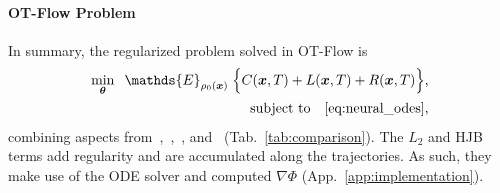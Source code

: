 \documentclass[letterpaper]{article}
\newcommand{\bfth}{\boldsymbol{\theta}}
\newcommand{\bfx}{\boldsymbol{x}}
\newcommand{\model}{OT-Flow} %
\newcommand{\E}{\ensuremath{\mathds{E}}}
\begin{document}
    


    \paragraph{\model{} Problem} In summary, the regularized problem solved in \model{} is 
	\begin{equation}
		\label{eq:MFGFlowObj}
		\begin{split}
		\min_{\bfth} \;\; \E_{\rho_0(\bfx)} \; \Big\{C(\bfx, T) + L(\bfx,T) + R(\bfx,T) \Big\}, \\ \text{subject to} \quad \eqref{eq:neural_odes}, 
		\end{split}
	\end{equation}
	combining aspects from~\citet{zhang2018monge},~\citet{grathwohl2019ffjord},~\citet{yang2019}, and~\citet{finlay2020train} (Tab.~\ref{tab:comparison}).
	The $L_2$ and HJB terms add regularity and are accumulated along the trajectories. As such, they make use of the ODE solver and computed $\nabla \Phi$ (App.~\ref{app:implementation}).
\end{document}

